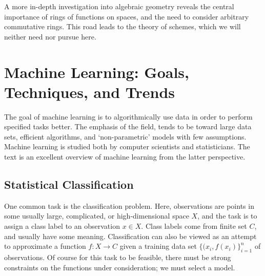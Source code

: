 \documentclass[11pt,titlepage]{article}
\numberwithin{equation}{section}
\begin{document}
    A more in-depth investigation into algebraic geometry reveals the central
    importance of rings of functions on spaces, and the need to consider
    arbitrary commutative rings.  This road leads to the theory of schemes,
    which we will neither need nor pursue here.

\section{Machine Learning: Goals, Techniques, and Trends}
    \label{sec:ML}

    The goal of machine learning is to algorithmically use data in order to
    perform specified tasks better.  The emphasis of the field, tends to be
    toward large data sets, efficient algorithms, and `non-parametric' models
    with few assumptions.  Machine learning is studied both by computer
    scientists and statisticians.  The text \cite{ESL} is an excellent overview
    of machine learning from the latter perspective.

\subsection{Statistical Classification}

    One common task is the classification problem.  Here, observations are
    points in some usually large, complicated, or high-dimensional space $X$,
    and the task is to assign a class label to an observation $x \in X$.  Class
    labels come from finite set $C$, and usually have some meaning.
    Classification can also be viewed as an attempt to approximate a function $f
    : X \to C$ given a training data set $\{(x_i, f(x_i)\}_{i=1}^n$ of
    observations.  Of course for this task to be feasible, there must be strong
    constraints on the functions under consideration; we must select a model.
\end{document}

